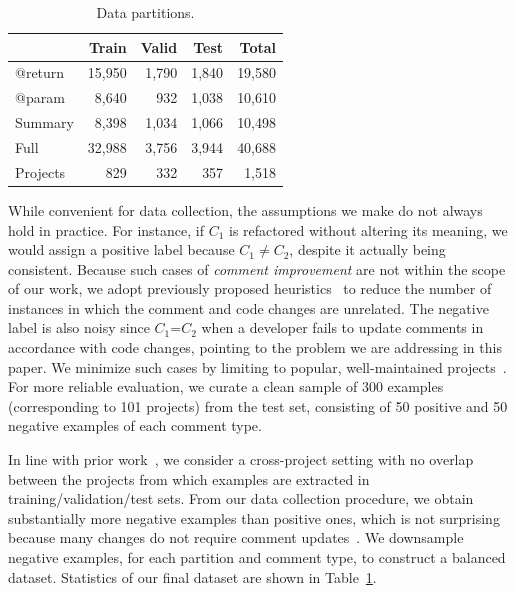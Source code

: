 \documentclass[letterpaper]{article} %
\newcommand{\CommentA}{$C_{1}$}
\newcommand{\CommentB}{$C_{2}$}
\begin{document}
\begin{table}
\centering
\small
\begin{tabular}{l@{\hskip 3mm}rrrr}
\hline
&  \bf Train & \bf Valid & \bf Test & \bf Total\\
\hline
@return & 15,950 & 1,790 & 1,840 & 19,580\\
@param & 8,640 & 932 & 1,038 & 10,610\\
Summary & 8,398 &  1,034 & 1,066 & 10,498\\
\hline
Full & 32,988 & 3,756 & 3,944 & 40,688\\
\hline
Projects & 829 & 332 & 357 & 1,518\\
\hline
\end{tabular}
\caption{\label{table:data-splits}Data partitions.}
\end{table}



While convenient for data collection, the assumptions we make do not always hold in practice. For instance, if \CommentA{} is refactored without altering its meaning, we would assign a positive label because \CommentA{}$\neq$\CommentB{}, despite it actually being consistent. Because such cases of \textit{comment improvement} are not within the scope of our work, we adopt previously proposed heuristics~\cite{panthaplackel2020update} to reduce the number of instances in which the comment and code changes are unrelated. The negative label is also noisy since \CommentA{}=\CommentB{} when a developer fails to update comments in accordance with code changes, pointing to the problem we are addressing in this paper. We minimize such cases by limiting to popular, well-maintained projects~\cite{ProjectQuality}. For more reliable evaluation, we curate a clean sample of 300 examples
(corresponding to 101 projects) from the test set, consisting of 50 positive and 50 negative examples of each comment type.


In line with prior work~\cite{RenCrossProject,Movshovitz-AttiasCohen13PredictingProgrammingComments}, we consider a cross-project setting with no overlap between the projects from which examples are extracted in training/validation/test sets. From our data collection procedure, we obtain substantially more negative examples than positive ones, which is not surprising because many changes do not require comment updates~\cite{WenLargeStudy}. We downsample negative examples, for each partition and comment type, to construct a balanced dataset.
Statistics of our final dataset are shown in Table~\ref{table:data-splits}.
\end{document}

